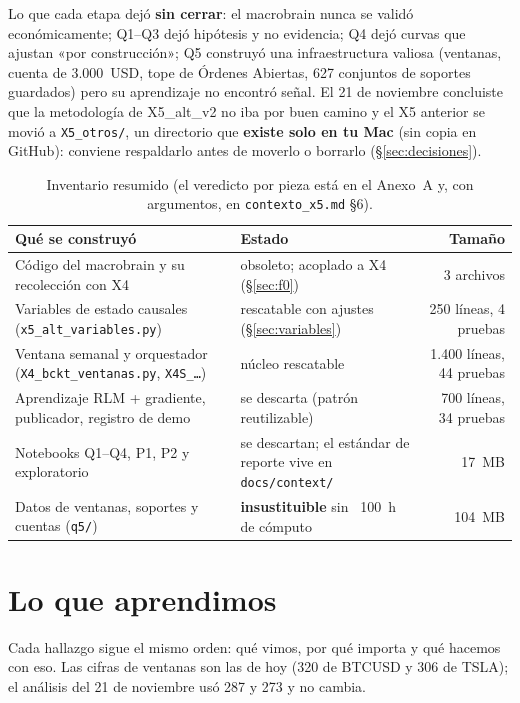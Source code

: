 \documentclass[11pt,a4paper]{article}
\newcommand{\code}[1]{\texttt{\small #1}}
\begin{document}
Lo que cada etapa dejó \textbf{sin cerrar}: el macrobrain nunca se validó económicamente; Q1--Q3 dejó hipótesis
y no evidencia; Q4 dejó curvas que ajustan «por construcción»; Q5 construyó una infraestructura valiosa
(ventanas, cuenta de 3.000~USD, tope de Órdenes Abiertas, 627 conjuntos de soportes guardados) pero su
aprendizaje no encontró señal. El 21 de noviembre concluiste que la metodología de X5\_alt\_v2 no iba por
buen camino y el X5 anterior se movió a \code{X5\_otros/}, un directorio que \textbf{existe solo en tu Mac} (sin
copia en GitHub): conviene respaldarlo antes de moverlo o borrarlo (§\ref{sec:decisiones}).

\begin{table}[H]
\centering\small
\begin{tabularx}{\linewidth}{p{6.6cm}Xr}
\toprule
Qué se construyó & Estado & Tamaño \\
\midrule
Código del macrobrain y su recolección con X4 & obsoleto; acoplado a X4 (§\ref{sec:f0}) & 3 archivos \\
Variables de estado causales (\code{x5\_alt\_variables.py}) & rescatable con ajustes (§\ref{sec:variables}) & 250 líneas, 4 pruebas \\
Ventana semanal y orquestador (\code{X4\_bckt\_ventanas.py}, \code{X4S\_…}) & núcleo rescatable & 1.400 líneas, 44 pruebas \\
Aprendizaje RLM + gradiente, publicador, registro de demo & se descarta (patrón reutilizable) & 700 líneas, 34 pruebas \\
Notebooks Q1--Q4, P1, P2 y exploratorio & se descartan; el estándar de reporte vive en \code{docs/context/} & 17~MB \\
Datos de ventanas, soportes y cuentas (\code{q5/}) & \textbf{insustituible} sin ~100~h de cómputo & 104~MB \\
\bottomrule
\end{tabularx}
\caption{Inventario resumido (el veredicto por pieza está en el Anexo~A y, con argumentos, en \code{contexto\_x5.md} §6).}
\end{table}

\section{Lo que aprendimos}

Cada hallazgo sigue el mismo orden: qué vimos, por qué importa y qué hacemos con eso. Las cifras de ventanas
son las de hoy (320 de BTCUSD y 306 de TSLA); el análisis del 21 de noviembre usó 287 y 273 y no cambia.
\end{document}
